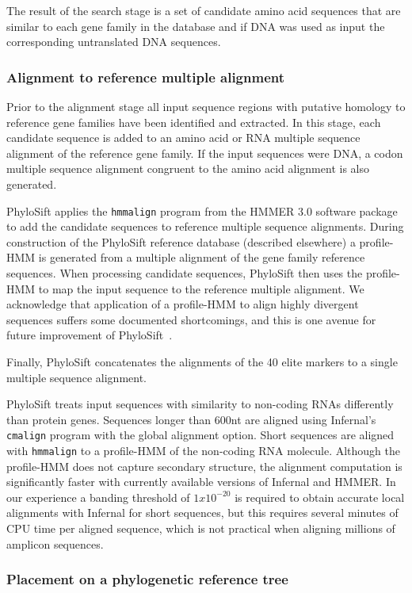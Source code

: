 \documentclass[10pt]{article}
\begin{document}
The result of the search stage is a set of candidate amino acid sequences that are similar to each gene family in the database and if {DNA} was used as input the corresponding untranslated {DNA} sequences.

\subsubsection*{Alignment to reference multiple alignment}
Prior to the alignment stage all input sequence regions with putative homology to reference gene families have been identified and extracted.
In this stage, each candidate sequence is added to an amino acid or {RNA} multiple sequence alignment of the reference gene family.
If the input sequences were {DNA}, a codon multiple sequence alignment congruent to the amino acid alignment is also generated.

PhyloSift applies the \texttt{hmmalign} program from the HMMER 3.0 software package~\cite{Eddy2011} to add the candidate sequences to reference multiple sequence alignments.
During construction of the PhyloSift reference database (described elsewhere) a profile-HMM is generated from a multiple alignment of the gene family reference sequences.
When processing candidate sequences, PhyloSift then uses the profile-HMM to map the input sequence to the reference multiple alignment.
We acknowledge that application of a profile-HMM to align highly divergent sequences suffers some documented shortcomings, and this is one avenue for future improvement of PhyloSift~\cite{Loytynoja2012}.

Finally, PhyloSift concatenates the alignments of the 40 elite markers to a single multiple sequence alignment.

PhyloSift treats input sequences with similarity to non-coding {RNA}s differently than protein genes.
Sequences longer than 600nt are aligned using Infernal's \texttt{cmalign} program with the global alignment option.
Short sequences are aligned with \texttt{hmmalign} to a profile-HMM of the non-coding RNA molecule.
Although the profile-HMM does not capture secondary structure, the alignment computation is significantly faster with currently available versions of Infernal and HMMER.
In our experience a banding threshold of $1x10^{-20}$ is required to obtain accurate local alignments with Infernal for short sequences, but this requires several minutes of CPU time per aligned sequence, which is not practical when aligning millions of amplicon sequences.

\subsubsection*{Placement on a phylogenetic reference tree}
\end{document}
